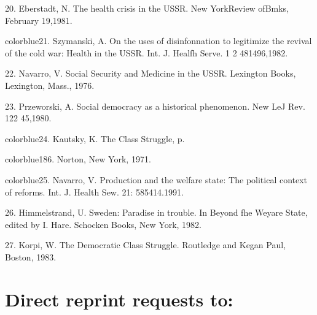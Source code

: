 	{\color{blue}20}. Eberstadt, N. The health crisis in the USSR. New YorkReview ofBmks, February 19,1981.


	{color{blue}21}. Szymanski, A. On the uses of disinfonnation to legitimize the revival of the cold war: Health in the USSR. Int. J. Healfh Serve. 1 2 481496,1982.


	{\color{blue}22}. Navarro, V. Social Security and Medicine in the USSR. Lexington Books, Lexington, Mass., 1976.


	{\color{blue}23}. Przeworski, A. Social democracy as a historical phenomenon. New LeJ Rev. 122 45,1980.


	{color{blue}24}. Kautsky, K. The Class Struggle, p.


	{color{blue}186}. Norton, New York, 1971.


	{color{blue}25}. Navarro, V. Production and the welfare state: The political context of reforms. Int. J. Health Sew. 21: 585414.1991.


	{\color{blue}26}. Himmelstrand, U. Sweden: Paradise in trouble. In Beyond fhe Weyare State, edited by I. Hare. Schocken Books, New York, 1982.


	{\color{blue}27}. Korpi, W. The Democratic Class Struggle. Routledge and Kegan Paul, Boston, 1983.


\section{Direct reprint requests to:}